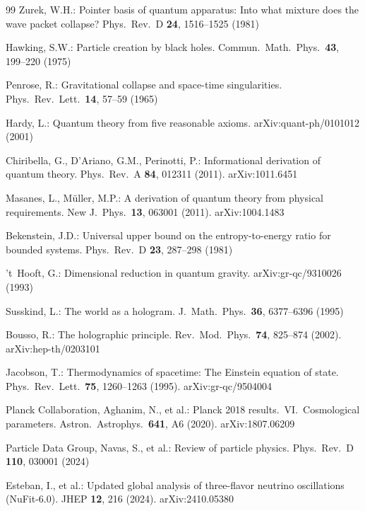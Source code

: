 \documentclass[11pt]{article}
\begin{document}
\begin{thebibliography}{99}
 Zurek, W.H.: Pointer basis of quantum apparatus: Into what mixture does the wave packet collapse? Phys.\ Rev.\ D \textbf{24}, 1516--1525 (1981)

 Hawking, S.W.: Particle creation by black holes. Commun.\ Math.\ Phys.\ \textbf{43}, 199--220 (1975)

 Penrose, R.: Gravitational collapse and space-time singularities. Phys.\ Rev.\ Lett.\ \textbf{14}, 57--59 (1965)

 Hardy, L.: Quantum theory from five reasonable axioms. arXiv:quant-ph/0101012 (2001)

 Chiribella, G., D'Ariano, G.M., Perinotti, P.: Informational derivation of quantum theory. Phys.\ Rev.\ A \textbf{84}, 012311 (2011). arXiv:1011.6451

 Masanes, L., M\"uller, M.P.: A derivation of quantum theory from physical requirements. New J.\ Phys.\ \textbf{13}, 063001 (2011). arXiv:1004.1483

 Bekenstein, J.D.: Universal upper bound on the entropy-to-energy ratio for bounded systems. Phys.\ Rev.\ D \textbf{23}, 287--298 (1981)

 't~Hooft, G.: Dimensional reduction in quantum gravity. arXiv:gr-qc/9310026 (1993)

 Susskind, L.: The world as a hologram. J.\ Math.\ Phys.\ \textbf{36}, 6377--6396 (1995)

 Bousso, R.: The holographic principle. Rev.\ Mod.\ Phys.\ \textbf{74}, 825--874 (2002). arXiv:hep-th/0203101

 Jacobson, T.: Thermodynamics of spacetime: The Einstein equation of state. Phys.\ Rev.\ Lett.\ \textbf{75}, 1260--1263 (1995). arXiv:gr-qc/9504004

 Planck Collaboration, Aghanim, N., et al.: Planck 2018 results.\ VI.\ Cosmological parameters. Astron.\ Astrophys.\ \textbf{641}, A6 (2020). arXiv:1807.06209

 Particle Data Group, Navas, S., et al.: Review of particle physics. Phys.\ Rev.\ D \textbf{110}, 030001 (2024)

 Esteban, I., et al.: Updated global analysis of three-flavor neutrino oscillations (NuFit-6.0). JHEP \textbf{12}, 216 (2024). arXiv:2410.05380

\end{thebibliography}
\end{document}
